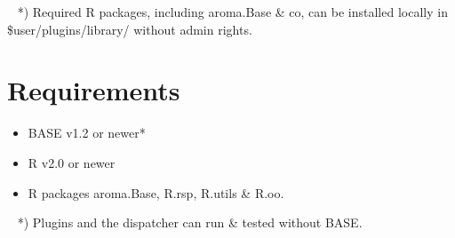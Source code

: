 \documentclass[portrait,plainsections]{sciposter}
\begin{document}
\begin{multicols}{3}
\begin{minipage}{\columnwidth}
{\small ~ *) Required R packages, including aroma.Base \& co, can be installed locally in \$user/plugins/library/ without admin rights.}
\end{minipage}


\begin{minipage}{\columnwidth}
\section{Requirements}
\begin{itemize}
 \item BASE v1.2 or newer*
 \item R v2.0 or newer
 \item R packages aroma.Base, R.rsp, R.utils \& R.oo.
\end{itemize}
{\small ~ *) Plugins and the dispatcher can run \& tested without BASE.}
\end{minipage}
 
\small



\end{multicols}                                          %
\end{document}

